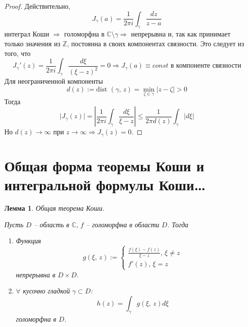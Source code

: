 \documentclass[a4paper,12pt]{article}
\renewcommand{\leq}{\ensuremath{\leqslant}}
\theoremstyle{plain}
\newtheorem{lemma}{Лемма}[section]
\theoremstyle{definition}
\theoremstyle{remark}
\begin{document}
\begin{proof}
	Действительно,
	\[
		J_\gamma(a) = \frac{1}{2\pi i}\int_\gamma\frac{dz}{z - a}
	\]
	интеграл Коши $\Rightarrow$ голоморфна в $\mathbb{C} \setminus \gamma \Rightarrow$ непрерывна и, так как принимает только значения из $\mathbb{Z}$, постоянна в своих компонентах связности. Это следует из того, что
	\[
		J_\gamma'(z) = \frac{1}{2\pi i} \int_\gamma\frac{d\xi}{(\xi - z)^2} = 0 \Rightarrow J_\gamma(a) \equiv const \text{ в компоненте связности}
	\]
	Для неограниченной компоненты
	\[
		d(z) := \text{dist }(\gamma,\, z) = \min_{\zeta \in \gamma}\vert z - \zeta\vert > 0
	\]
	Тогда
	\[
		\vert J_\gamma(z)\vert = \left\vert\frac{1}{2\pi i}\int_\gamma\frac{d\xi}{\xi - z}\right\vert \leq \frac{1}{2\pi d(z)}\int_\gamma\vert d\xi\vert
	\]
	Но $d(z) \to \infty$ при $z \to \infty \Rightarrow J_\gamma(z) = 0$.
\end{proof}

\section{Общая форма теоремы Коши и интегральной формулы Коши\dots}
\begin{lemma}
	Общая теорема Коши.

	Пусть $D$ -- область в $\mathbb{C},\, f$ -- голоморфна в области $D$. Тогда
	\begin{enumerate}
		\item Функция
		      \[
			      g(\xi,\, z) := \begin{cases}
				      \frac{f(\xi) - f(z)}{\xi - z},\, \xi \neq z \\
				      f'(z),\, \xi = z
			      \end{cases}
		      \]
		      непрерывна в $D \times D$.
		\item $\forall$ кусочно гладкой $\gamma \subset D$:
		      \[
			      h(z) = \int_\gamma g(\xi,\, z)d\xi
		      \]
		      голоморфна в $D$.
	\end{enumerate}
\end{lemma}
\end{document}
